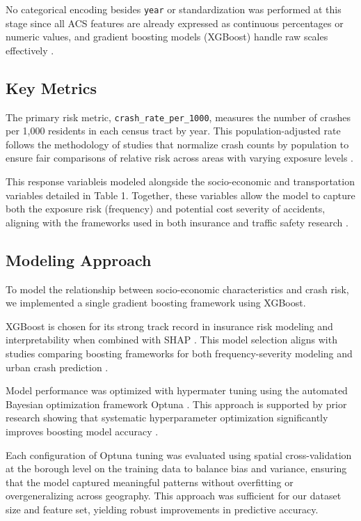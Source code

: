 \documentclass[
  number,
  review,
  3p]{elsarticle}
\begin{document}
No categorical encoding besides \texttt{year} or standardization was
performed at this stage since all ACS features are already expressed as
continuous percentages or numeric values, and gradient boosting models
(XGBoost) handle raw scales effectively \citep{henckaerts}.

\subsection{\texorpdfstring{\textbf{Key
Metrics}}{Key Metrics}}\label{key-metrics}

The primary risk metric, \texttt{crash\_rate\_per\_1000}, measures the
number of crashes per 1,000 residents in each census tract by year. This
population-adjusted rate follows the methodology of studies that
normalize crash counts by population to ensure fair comparisons of
relative risk across areas with varying exposure levels
\citep{brubacher, cabrera}.

This response variableis modeled alongside the socio-economic and
transportation variables detailed in Table 1. Together, these variables
allow the model to capture both the exposure risk (frequency) and
potential cost severity of accidents, aligning with the frameworks used
in both insurance \citep{clemente, henckaerts} and traffic safety
research \citep{dong}.

\subsection{\texorpdfstring{\textbf{Modeling
Approach}}{Modeling Approach}}\label{modeling-approach}

To model the relationship between socio-economic characteristics and
crash risk, we implemented a single gradient boosting framework using
XGBoost.

XGBoost \citep{xgboost} is chosen for its strong track record in
insurance risk modeling and interpretability when combined with SHAP
\citep{dong}. This model selection aligns with studies comparing
boosting frameworks for both frequency-severity modeling
\citep{henckaerts} and urban crash prediction \citep{adeniyi}.

Model performance was optimized with hypermater tuning using the
automated Bayesian optimization framework Optuna \citep{optuna}. This
approach is supported by prior research showing that systematic
hyperparameter optimization significantly improves boosting model
accuracy \citep{liu}.

Each configuration of Optuna tuning was evaluated using spatial
cross-validation at the borough level on the training data to balance
bias and variance, ensuring that the model captured meaningful patterns
without overfitting or overgeneralizing across geography. This approach
was sufficient for our dataset size and feature set, yielding robust
improvements in predictive accuracy.
\end{document}
